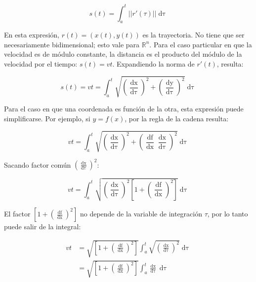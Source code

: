 \documentclass{article}
\renewcommand{\Bbb}{\mathbb}
\begin{document}
\begin{equation}
s(t) = \int_{a}^t ||r'(\tau)|| \mathop{d\tau}
\end{equation}

En esta expresión, $r(t) = (x(t), y(t))$ es la trayectoria. No tiene que ser necesariamente bidimensional; esto vale para $\Bbb R^n$. Para el caso particular en que la velocidad es de módulo constante, la distancia es el producto del módulo de la velocidad por el tiempo: $s(t) = v t$. Expandiendo la norma de $r'(t)$, resulta:

\begin{equation}
s(t) = v t = \int_{a}^t \sqrt{ \left( \frac{\mathop{dx}}{\mathop{d\tau}} \right)^2 + \left( \frac{\mathop{dy}}{\mathop{d\tau}} \right)^2 } \mathop{d\tau}
\end{equation}

Para el caso en que una coordenada es función de la otra, esta expresión puede simplificarse. Por ejemplo, si $y = f(x)$, por la regla de la cadena resulta:

\begin{equation}
v t = \int_{a}^t \sqrt{ \left( \frac{\mathop{dx}}{\mathop{d\tau}} \right)^2 + \left( \frac{\mathop{df}}{\mathop{dx}} \frac{\mathop{dx}}{\mathop{d\tau}} \right)^2 } \mathop{d\tau}
\end{equation}

Sacando factor común $\left( \frac{\mathop{dx}}{\mathop{d\tau}} \right)^2$:

\begin{equation}
v t = \int_{a}^t \sqrt{ \left( \frac{\mathop{dx}}{\mathop{d\tau}} \right)^2 \left[ 1 + \left( \frac{\mathop{df}}{\mathop{dx}} \right)^2\right] } \mathop{d\tau}
\end{equation}

El factor $\left[ 1 + \left( \frac{\mathop{df}}{\mathop{dx}} \right)^2\right]$ no depende de la variable de integración $\tau$, por lo tanto puede salir de la integral:

\begin{subequations}
\begin{align}
v t &= \sqrt{ \left[ 1 + \left( \frac{\mathop{df}}{\mathop{dx}} \right)^2\right] } \int_{a}^t \sqrt{ \left( \frac{\mathop{dx}}{\mathop{d\tau}} \right)^2 } \mathop{d\tau} \\
&= \sqrt{ \left[ 1 + \left( \frac{\mathop{df}}{\mathop{dx}} \right)^2\right] } \int_{a}^t \frac{\mathop{dx}}{\mathop{d\tau}} \mathop{d\tau}
\end{align}
\end{subequations}
\end{document}
